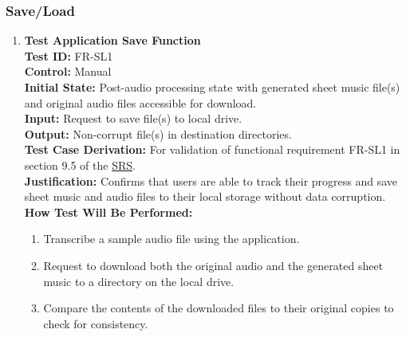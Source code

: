 \documentclass[12pt, titlepage]{article}
\begin{document}
  \subsubsection{Save/Load}
  \label{FR-SL}
  \begin{enumerate}
    \item \textbf{Test Application Save Function} \\
      \newline
      \textbf{Test ID:} FR-SL1 \\
      \textbf{Control:} Manual \\
      \textbf{Initial State:} Post-audio processing state with generated sheet music file(s) and original audio files accessible 
      for download. \\
      \textbf{Input:} Request to save file(s) to local drive. \\
      \textbf{Output:} Non-corrupt file(s) in destination directories. \\
      \textbf{Test Case Derivation:} For validation of functional requirement FR-SL1 in section 9.5 of the 
      \href{https://github.com/emilyperica/ScoreGen/blob/main/docs/SRS-Volere/SRS.pdf}{SRS}. \\
      \textbf{Justification:} Confirms that users are able to track their progress and save sheet music and audio files to their local 
      storage without data corruption.\\
      \textbf{How Test Will Be Performed:}
      \begin{enumerate}
          \item Transcribe a sample audio file using the application.
          \item Request to download both the original audio and the generated sheet music to a directory on the local drive.
          \item Compare the contents of the downloaded files to their original copies to check for consistency.
      \end{enumerate}
    

\end{enumerate}
\end{document}
